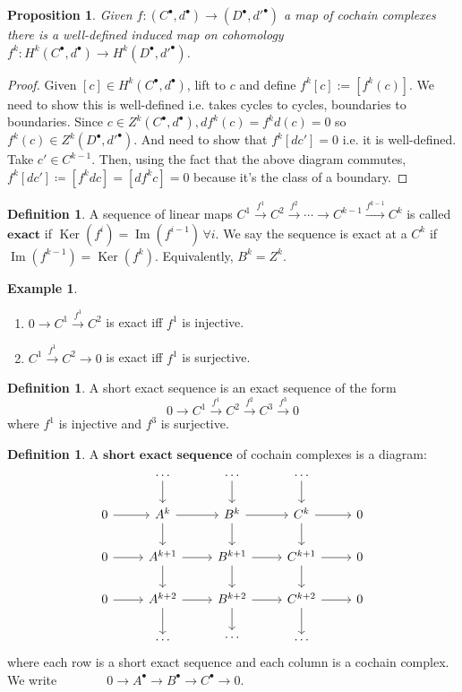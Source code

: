 \documentclass[10pt]{article}
\theoremstyle{plain}
\newtheorem{prop}[thm]{Proposition}
\theoremstyle{definition}
\newtheorem{defn}[thm]{Definition} %
\newtheorem{exmp}[thm]{Example} %
\DeclareMathOperator{\Ker}{Ker}
\DeclareMathOperator{\Ima}{Im}
\newcommand{\cochaincomplex}{\left(C^\bullet,d^\bullet\right)}
\newcommand{\varcochaincomplex}{\left(D^\bullet,d'^\bullet\right)}
\newcommand{\SES}[3]{0\to {#1}^\bullet \to {#2}^\bullet \to {#3}^\bullet \to 0}
\newcommand{\ABCSES}{\SES{A}{B}{C}}
\begin{document}
\begin{prop}
Given $f: \cochaincomplex \to \varcochaincomplex$ a map of cochain complexes there is a well-defined induced map on cohomology $f^k : H^k\cochaincomplex\to H^k \varcochaincomplex $.
\end{prop}
\begin{proof}
Given $[c]\in H^k \cochaincomplex$, lift to $c$ and define $f^k[c] := [f^k(c)]$. We need to show this is well-defined i.e. takes cycles to cycles, boundaries to boundaries. Since $c \in Z^k \cochaincomplex, df^k(c) = f^k d(c) = 0$ so $f^k(c) \in Z^k \varcochaincomplex$. And need to show that $f^k[dc'] = 0$ i.e. it is well-defined. Take $c' \in C^{k-1}.$ Then, using the fact that the above diagram commutes, $f^k[dc'] \coloneqq [f^kdc] = [df^kc] = 0$ because it's the class of a boundary.
\end{proof}
\begin{defn}
A sequence of linear maps $C^1 \xrightarrow{f^1}C^2 \xrightarrow{f^2} \cdots \to C^{k-1} \xrightarrow{f^{k-1}} C^k$ is called  $\textbf{exact}$ if $\Ker(f^i) = \Ima(f^{i-1}) \,\forall i$. We say the sequence is exact at a $C^k$ if $\Ima(f^{k-1}) = \Ker(f^{k})$. Equivalently, $B^k = Z^k.$
\end{defn}
\begin{exmp}
\begin{enumerate}
    \item $0\to C^1 \xrightarrow{f^1} C^2$ is exact iff $f^1$ is injective.
    \item $C^1 \xrightarrow{f^1}C^2 \to 0$ is exact iff $f^1$ is surjective.
\end{enumerate}
\end{exmp}
\begin{defn}\label{defn:shortexactsequence}
A short exact sequence is an exact sequence of the form $$0 \to C^1 \xrightarrow{f^1} C^2 \xrightarrow{f^2} C^3\xrightarrow{f^3} 0$$ where $f^1$ is injective and $f^3$ is surjective.
\end{defn}
\begin{defn}
A $\textbf{short exact sequence}$ of cochain complexes is a diagram: 
$$\begin{tikzcd}
            & \dots \arrow[d]             & \dots \arrow[d]             & \dots \arrow[d]             &   \\
0 \arrow[r] & A^k \arrow[r] \arrow[d]     & B^k \arrow[r] \arrow[d]     & C^k \arrow[r] \arrow[d]     & 0 \\
0 \arrow[r] & A^{k+1} \arrow[r] \arrow[d] & B^{k+1} \arrow[r] \arrow[d] & C^{k+1} \arrow[r] \arrow[d] & 0 \\
0 \arrow[r] & A^{k+2} \arrow[d] \arrow[r] & B^{k+2} \arrow[r] \arrow[d] & C^{k+2} \arrow[r] \arrow[d] & 0 \\
            & \dots                       & \cdots                      & \dots                       &  
\end{tikzcd} $$
where each row is a short exact sequence and each column is a cochain complex. We write $\;\;\;\;\;\; \qquad\ABCSES$.
\end{defn}
\end{document}
